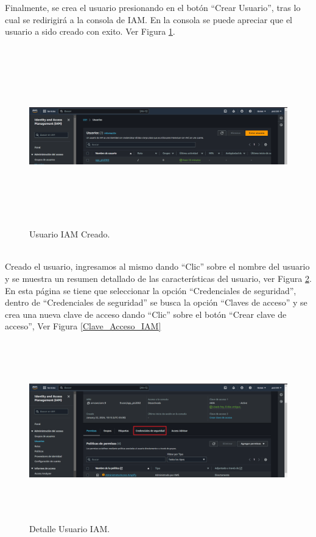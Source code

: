 \documentclass[a4paper,10pt, oneside, titlepage]{article}
\begin{document}
	\indent Finalmente, se crea el usuario presionando en el botón ``Crear Usuario'', tras lo cual se redirigirá a la consola de IAM. En la consola se puede apreciar que el usuario a sido creado con exito. Ver Figura \ref{Usuario_IAM_Creado}.
	\begin{figure}[!h]
		\centering
		\includegraphics[width = 1\linewidth, height = 7.8cm]{Usuario_IAM_Creado.png}
		\caption{Usuario IAM Creado.}
		\label{Usuario_IAM_Creado}
	\end{figure} \\
	\indent Creado el usuario, ingresamos al mismo dando ``Clic'' sobre el nombre del usuario y se muestra un resumen detallado de las características del usuario, ver Figura \ref{Detalle_Usuario_IAM}. En esta página se tiene que seleccionar la opción ``Credenciales de seguridad'', dentro de ``Credenciales de seguridad'' se busca la opción ``Claves de acceso'' y se crea una nueva clave de acceso dando ``Clic'' sobre el botón ``Crear clave de acceso'', Ver Figura \ref{Clave_Acceso_IAM}
	\begin{figure}[!h]
		\centering
		\includegraphics[width = 1\linewidth, height = 7.8cm]{Detalle_Usuario_IAM.png}
		\caption{Detalle Usuario IAM.}
		\label{Detalle_Usuario_IAM}
	\end{figure}
\end{document}
